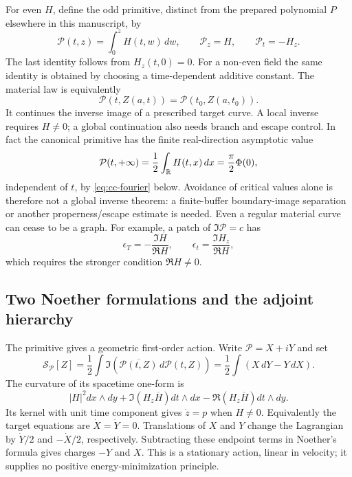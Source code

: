 For even $H$, define the odd primitive, distinct from the prepared
polynomial $P$ elsewhere in this manuscript, by
\begin{equation}
 \mathcal P(t,z)=\int_0^zH(t,w)\,dw,
 \qquad \mathcal P_z=H,\qquad \mathcal P_t=-H_z.
 \label{eq:cc-primitive}
\end{equation}
The last identity follows from $H_z(t,0)=0$.  For a non-even field the
same identity is obtained by choosing a time-dependent additive
constant.  The material law is equivalently
\begin{equation}
 \mathcal P(t,Z(a,t))=\mathcal P(t_0,Z(a,t_0)).
 \label{eq:cc-primitive-image}
\end{equation}
It continues the inverse image of a prescribed target curve.  A local
inverse requires $H\ne0$; a global continuation also needs branch and
escape control.  In fact the canonical primitive has the finite
real-direction asymptotic value
\[
 \mathcal P(t,+\infty)=\frac12\int_{\mathbb R}H(t,x)\,dx
                     =\frac{\pi}{2}\Phi(0),
\]
independent of $t$, by \eqref{eq:cc-fourier} below.
Avoidance of critical values alone is therefore not a global inverse
theorem: a finite-buffer boundary-image separation or another
properness/escape estimate is needed.  Even a regular material curve
can cease to be a graph.  For example, a patch of
$\Im\mathcal P=c$ has
\[
 \epsilon_T=-\frac{\Im H}{\Re H},\qquad
 \epsilon_t=\frac{\Im H_z}{\Re H},
\]
which requires the stronger condition $\Re H\ne0$.

\subsection{Two Noether formulations and the adjoint hierarchy}

The primitive gives a geometric first-order action.  Write
$\mathcal P=X+iY$ and set
\begin{equation}
 \mathcal S_{\mathcal P}[Z]
 =\frac12\int\Im(\overline{\mathcal P(t,Z)}\,d\mathcal P(t,Z))
 =\frac12\int(X\,dY-Y\,dX).
 \label{eq:cc-primitive-action}
\end{equation}
The curvature of its spacetime one-form is
\[
 |H|^2dx\wedge dy+
 \Im(H_z\overline H)dt\wedge dx-
 \Re(H_z\overline H)dt\wedge dy.
\]
Its kernel with unit time component gives $\dot z=p$ when $H\ne0$.
Equivalently the target equations are $\dot X=\dot Y=0$.
Translations of $X$ and $Y$ change the Lagrangian by
$\dot Y/2$ and $-\dot X/2$, respectively.  Subtracting these endpoint
terms in Noether's formula gives charges $-Y$ and $X$.
This is a stationary action, linear in velocity; it supplies no positive
energy-minimization principle.

